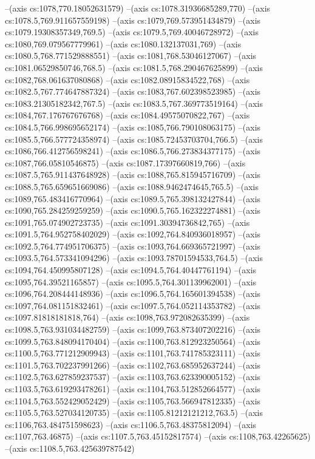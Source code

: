 --(axis cs:1078,770.18052631579)
--(axis cs:1078.31936685289,770)
--(axis cs:1078.5,769.911657559198)
--(axis cs:1079,769.573951434879)
--(axis cs:1079.19308357349,769.5)
--(axis cs:1079.5,769.40046728972)
--(axis cs:1080,769.079567779961)
--(axis cs:1080.132137031,769)
--(axis cs:1080.5,768.771529888551)
--(axis cs:1081,768.53046127067)
--(axis cs:1081.06529850746,768.5)
--(axis cs:1081.5,768.290467625899)
--(axis cs:1082,768.061637080868)
--(axis cs:1082.08915834522,768)
--(axis cs:1082.5,767.774647887324)
--(axis cs:1083,767.602398523985)
--(axis cs:1083.21305182342,767.5)
--(axis cs:1083.5,767.369773519164)
--(axis cs:1084,767.176767676768)
--(axis cs:1084.49575070822,767)
--(axis cs:1084.5,766.998695652174)
--(axis cs:1085,766.790108063175)
--(axis cs:1085.5,766.577724358974)
--(axis cs:1085.72453703704,766.5)
--(axis cs:1086,766.412756598241)
--(axis cs:1086.5,766.273834377175)
--(axis cs:1087,766.05810546875)
--(axis cs:1087.17397660819,766)
--(axis cs:1087.5,765.911437648928)
--(axis cs:1088,765.815945716709)
--(axis cs:1088.5,765.659651669086)
--(axis cs:1088.9462474645,765.5)
--(axis cs:1089,765.483416770964)
--(axis cs:1089.5,765.398132427844)
--(axis cs:1090,765.284259259259)
--(axis cs:1090.5,765.162322274881)
--(axis cs:1091,765.074902723735)
--(axis cs:1091.30394736842,765)
--(axis cs:1091.5,764.952758402029)
--(axis cs:1092,764.840936018957)
--(axis cs:1092.5,764.774951706375)
--(axis cs:1093,764.669365721997)
--(axis cs:1093.5,764.573341094296)
--(axis cs:1093.78701594533,764.5)
--(axis cs:1094,764.450995807128)
--(axis cs:1094.5,764.40447761194)
--(axis cs:1095,764.39521165857)
--(axis cs:1095.5,764.301139962001)
--(axis cs:1096,764.208444148936)
--(axis cs:1096.5,764.165601394538)
--(axis cs:1097,764.081151832461)
--(axis cs:1097.5,764.052114353782)
--(axis cs:1097.81818181818,764)
--(axis cs:1098,763.972082635399)
--(axis cs:1098.5,763.931034482759)
--(axis cs:1099,763.873407202216)
--(axis cs:1099.5,763.848094170404)
--(axis cs:1100,763.812923250564)
--(axis cs:1100.5,763.771212909943)
--(axis cs:1101,763.741785323111)
--(axis cs:1101.5,763.702237991266)
--(axis cs:1102,763.685952637244)
--(axis cs:1102.5,763.627859237537)
--(axis cs:1103,763.623390005152)
--(axis cs:1103.5,763.619293478261)
--(axis cs:1104,763.512852664577)
--(axis cs:1104.5,763.552429052429)
--(axis cs:1105,763.566947812335)
--(axis cs:1105.5,763.527034120735)
--(axis cs:1105.81212121212,763.5)
--(axis cs:1106,763.484751598623)
--(axis cs:1106.5,763.48375812094)
--(axis cs:1107,763.46875)
--(axis cs:1107.5,763.45152817574)
--(axis cs:1108,763.42265625)
--(axis cs:1108.5,763.425639787542)
